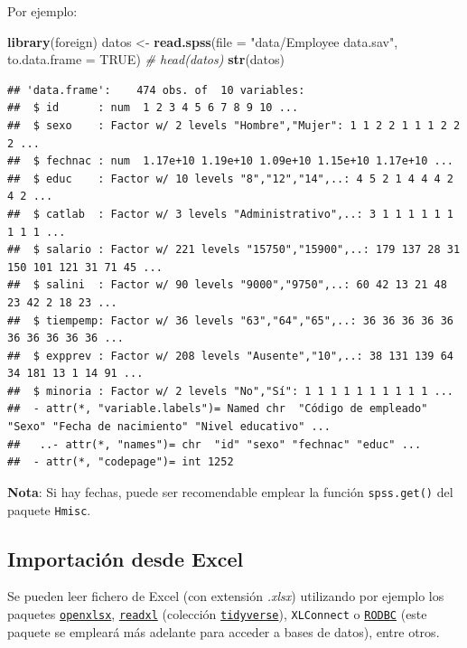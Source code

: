\documentclass[]{book}
\newenvironment{Shaded}{\begin{snugshade}}{\end{snugshade}}
\newcommand{\KeywordTok}[1]{\textcolor[rgb]{0.13,0.29,0.53}{\textbf{#1}}}
\newcommand{\DataTypeTok}[1]{\textcolor[rgb]{0.13,0.29,0.53}{#1}}
\newcommand{\StringTok}[1]{\textcolor[rgb]{0.31,0.60,0.02}{#1}}
\newcommand{\CommentTok}[1]{\textcolor[rgb]{0.56,0.35,0.01}{\textit{#1}}}
\newcommand{\OtherTok}[1]{\textcolor[rgb]{0.56,0.35,0.01}{#1}}
\newcommand{\NormalTok}[1]{#1}
\begin{document}
Por ejemplo:

\begin{Shaded}
\begin{Highlighting}[]
\KeywordTok{library}\NormalTok{(foreign)}
\NormalTok{datos <-}\StringTok{ }\KeywordTok{read.spss}\NormalTok{(}\DataTypeTok{file =} \StringTok{"data/Employee data.sav"}\NormalTok{, }\DataTypeTok{to.data.frame =} \OtherTok{TRUE}\NormalTok{)}
\CommentTok{# head(datos)}
\KeywordTok{str}\NormalTok{(datos)}
\end{Highlighting}
\end{Shaded}

\begin{verbatim}
## 'data.frame':    474 obs. of  10 variables:
##  $ id      : num  1 2 3 4 5 6 7 8 9 10 ...
##  $ sexo    : Factor w/ 2 levels "Hombre","Mujer": 1 1 2 2 1 1 1 2 2 2 ...
##  $ fechnac : num  1.17e+10 1.19e+10 1.09e+10 1.15e+10 1.17e+10 ...
##  $ educ    : Factor w/ 10 levels "8","12","14",..: 4 5 2 1 4 4 4 2 4 2 ...
##  $ catlab  : Factor w/ 3 levels "Administrativo",..: 3 1 1 1 1 1 1 1 1 1 ...
##  $ salario : Factor w/ 221 levels "15750","15900",..: 179 137 28 31 150 101 121 31 71 45 ...
##  $ salini  : Factor w/ 90 levels "9000","9750",..: 60 42 13 21 48 23 42 2 18 23 ...
##  $ tiempemp: Factor w/ 36 levels "63","64","65",..: 36 36 36 36 36 36 36 36 36 36 ...
##  $ expprev : Factor w/ 208 levels "Ausente","10",..: 38 131 139 64 34 181 13 1 14 91 ...
##  $ minoria : Factor w/ 2 levels "No","Sí": 1 1 1 1 1 1 1 1 1 1 ...
##  - attr(*, "variable.labels")= Named chr  "Código de empleado" "Sexo" "Fecha de nacimiento" "Nivel educativo" ...
##   ..- attr(*, "names")= chr  "id" "sexo" "fechnac" "educ" ...
##  - attr(*, "codepage")= int 1252
\end{verbatim}

\textbf{Nota}: Si hay fechas, puede ser recomendable emplear la función
\texttt{spss.get()} del paquete \texttt{Hmisc}.

\subsection{Importación desde Excel}\label{importaciuxf3n-desde-excel}

Se pueden leer fichero de Excel (con extensión \emph{.xlsx}) utilizando
por ejemplo los paquetes
\href{https://cran.r-project.org/web/packages/openxlsx/index.html}{\texttt{openxlsx}},
\href{https://readxl.tidyverse.org}{\texttt{readxl}} (colección
\href{https://www.tidyverse.org/}{\texttt{tidyverse}}),
\texttt{XLConnect} o
\href{https://cran.r-project.org/web/packages/RODBC/index.html}{\texttt{RODBC}}
(este paquete se empleará más adelante para acceder a bases de datos),
entre otros.
\end{document}

